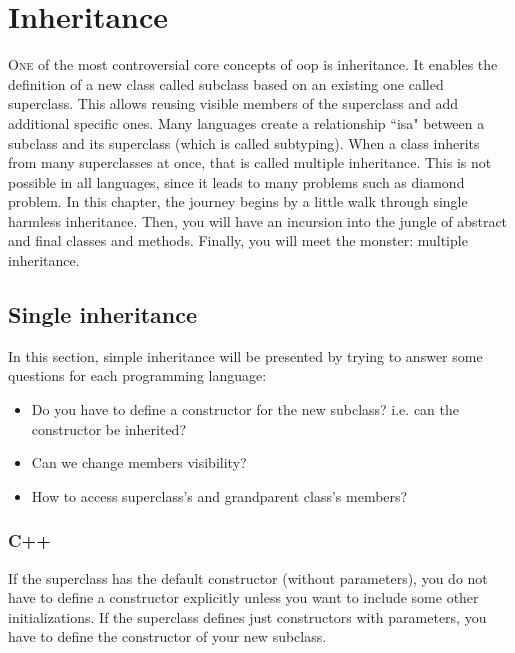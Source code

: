 \documentclass{KodeBook}
\begin{document}
		\mainmatter
	
\fi

\chapter{Inheritance}

\begin{introduction}
	\lettrine{O}{ne} of the most controversial core concepts of \ac{oop} is inheritance.
	It enables the definition of a new class called subclass based on an existing one called superclass. 
	This allows reusing visible members of the superclass and add additional specific ones. 
	Many languages create a relationship ``isa" between a subclass and its superclass (which is called subtyping).
	When a class inherits from many superclasses at once, that is called multiple inheritance. 
	This is not possible in all languages, since it leads to many problems such as diamond problem.
	In this chapter, the journey begins by a little walk through single harmless inheritance. 
	Then, you will have an incursion into the jungle of abstract and final classes and methods. 
	Finally, you will meet the monster: multiple inheritance. 
\end{introduction} 


\section{Single inheritance}

In this section, simple inheritance will be presented by trying to answer some questions for each programming language:
\begin{itemize}
	\item Do you have to define a constructor for the new subclass? i.e. can the constructor be inherited?
	\item Can we change members visibility?
	\item How to access superclass's and grandparent class's members?
\end{itemize}

\subsection{C++}

If the superclass has the default constructor (without parameters), you do not have to define a constructor explicitly unless you want to include some other initializations. 
If the superclass defines just constructors with parameters, you have to define the constructor of your new subclass. 
\end{document}
